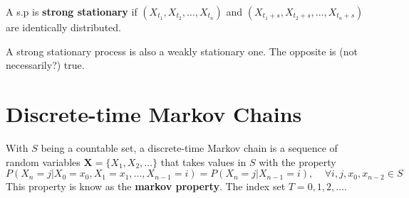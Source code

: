 A s.p is \textbf{strong stationary} if $(X_{t_1},X_{t_2},\dots,X_{t_n})$ and
$(X_{t_1+s},X_{t_2+s},\dots,X_{t_n+s})$ are identically distributed.

A strong stationary process is also a weakly stationary one. The opposite is
(not necessarily?) true.

\section{Discrete-time Markov Chains}
With $S$ being a countable set, a discrete-time Markov chain is a sequence of
random variables $\bm{X}=\{X_1,X_2,\dots\}$ that takes values in $S$ with the
property
\begin{equation}
    P(X_n=j|X_0=x_0, X_1=x_1,\dots,X_{n-1}=i) = P(X_n=j|X_{n-1}=i),\;\;\;\; \forall i,j,x_0,x_{n-2} \in S
\end{equation}
This property is know as the \textbf{markov property}. The index set
$T={0,1,2,\dots}$.
